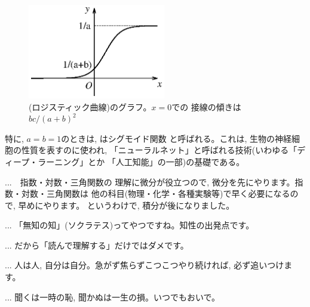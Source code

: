\begin{figure}[h]
    \centering
    \includegraphics[width=6.0cm]{logistic_abc.eps}
    \caption{(ロジスティック曲線)のグラフ。$x=0$での
接線の傾きは$bc/(a+b)^2$}\label{fig:logistic_abc}
\end{figure}


特に, $a=b=1$のときは, はシグモイド関数
と呼ばれる。これは, 生物の神経細胞の性質を表すのに使われ, 
「ニューラルネット」と呼ばれる技術(いわゆる「ディープ・ラーニング」とか
「人工知能」の一部)の基礎である。\\

\begin{faq}\small{ ...　指数・対数・三角関数の
理解に微分が役立つので, 微分を先にやります。指数・対数・三角関数は
他の科目(物理・化学・各種実験等)で早く必要になるので, 早めにやります。
というわけで, 積分が後になりました。}\end{faq}

\begin{faq}\small{
... 「無知の知」(ソクラテス)ってやつですね。知性の出発点です。}\end{faq}

\begin{faq}\small{
... だから「読んで理解する」だけではダメです。}\end{faq}

\begin{faq}\small{
... 人は人, 自分は自分。急がず焦らずこつこつやり続ければ, 必ず追いつけます。}\end{faq}

\begin{faq}\small{
... 聞くは一時の恥, 聞かぬは一生の損。いつでもおいで。}\end{faq}
\hv

